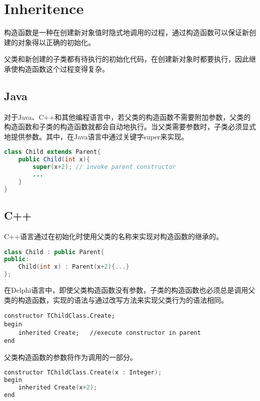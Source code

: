 \section{Inheritence}


构造函数是一种在创建新对象值时隐式地调用的过程，通过构造函数可以保证新创建的对象得以正确的初始化。

父类和新创建的子类都有待执行的初始化代码，在创建新对象时都要执行，因此继承使构造函数这个过程变得复杂。


\subsection{Java}


对于Java、C++和其他编程语言中，若父类的构造函数不需要附加参数，父类的构造函数和子类的构造函数就都会自动地执行。当父类需要参数时，子类必须显式地提供参数。其中，在Java语言中通过关键字super来实现。




\begin{lstlisting}[language=Java]
class Child extends Parent{
	public Child(int x){
		super(x+2); // invoke parent constructor
		...
	}
}
\end{lstlisting}


\subsection{C++}

C++语言通过在初始化时使用父类的名称来实现对构造函数的继承的。



\begin{lstlisting}[language=C++]
class Child : public Parent{
public:
	Child(int x) : Parent(x+2){...}
};
\end{lstlisting}



在Delphi语言中，即使父类构造函数没有参数，子类的构造函数也必须总是调用父类的构造函数，实现的语法与通过改写方法来实现父类行为的语法相同。


\begin{lstlisting}[language=Delphi]
constructor TChildClass.Create;
begin
	inherited Create;	//execute constructor in parent
end
\end{lstlisting}

父类构造函数的参数将作为调用的一部分。

\begin{lstlisting}[language=C++]
constructor TChildClass.Create(x : Integer);
begin
	inherited Create(x+2);
end
\end{lstlisting}

